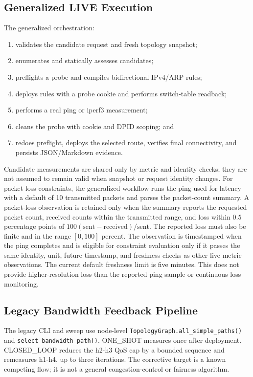 \documentclass[conference]{IEEEtran}
\begin{document}
\subsection{Generalized LIVE Execution}
The generalized orchestration:
\begin{enumerate}
\item validates the candidate request and fresh topology snapshot;
\item enumerates and statically assesses candidates;
\item preflights a probe and compiles bidirectional IPv4/ARP rules;
\item deploys rules with a probe cookie and performs switch-table readback;
\item performs a real ping or iperf3 measurement;
\item cleans the probe with cookie and DPID scoping; and
\item redoes preflight, deploys the selected route, verifies final
connectivity, and persists JSON/Markdown evidence.
\end{enumerate}
Candidate measurements are shared only by metric and identity checks; they
are not assumed to remain valid when snapshot or request identity changes.
For packet-loss constraints, the generalized workflow runs the ping used for
latency with a default of 10 transmitted packets and parses the packet-count
summary. A packet-loss observation is retained only when the summary reports
the requested packet count, received counts within the transmitted range,
and loss within $0.5$ percentage points of
$100(\text{sent}-\text{received})/\text{sent}$.
The reported loss must also be finite and in the range $[0,100]$ percent.
The observation is timestamped
when the ping completes and is eligible for constraint evaluation only if it
passes the same identity, unit, future-timestamp, and freshness checks as
other live metric observations. The current default freshness limit is five
minutes. This does not provide higher-resolution loss than the reported ping
sample or continuous loss monitoring.

\subsection{Legacy Bandwidth Feedback Pipeline}
The legacy CLI and sweep use node-level \texttt{TopologyGraph.all\_simple\_paths()}
and \texttt{select\_bandwidth\_path()}. ONE\_SHOT measures once after deployment.
CLOSED\_LOOP reduces the h2-h3 QoS cap by a bounded sequence and remeasures
h1-h4, up to three iterations. The corrective target is a known competing
flow; it is not a general congestion-control or fairness algorithm.
\end{document}
